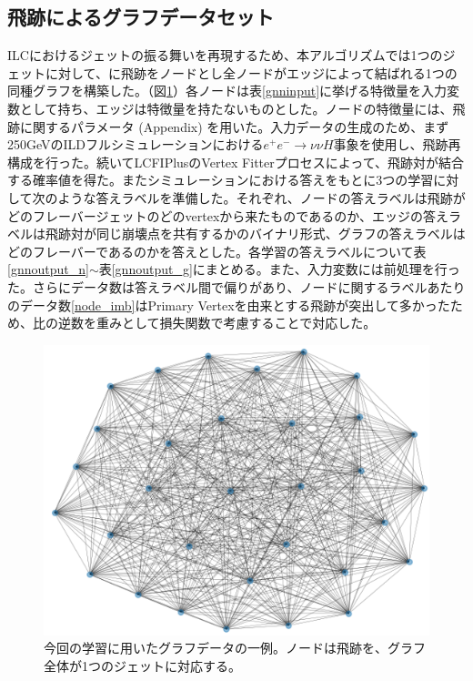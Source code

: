 \subsection{飛跡によるグラフデータセット}
ILCにおけるジェットの振る舞いを再現するため、本アルゴリズムでは1つのジェットに対して、に飛跡をノードとし全ノードがエッジによって結ばれる1つの同種グラフを構築した。（図\ref{1graph}）各ノードは表\ref{gnninput}に挙げる特徴量を入力変数として持ち、エッジは特徴量を持たないものとした。ノードの特徴量には、飛跡に関するパラメータ (Appendix) を用いた。入力データの生成のため、まず250GeVのILDフルシミュレーションにおける$e^+e^- \rightarrow \nu \nu H$事象を使用し、飛跡再構成を行った。続いてLCFIPlusのVertex Fitterプロセスによって、飛跡対が結合する確率値を得た。またシミュレーションにおける答えをもとに3つの学習に対して次のような答えラベルを準備した。それぞれ、ノードの答えラベルは飛跡がどのフレーバージェットのどのvertexから来たものであるのか、エッジの答えラベルは飛跡対が同じ崩壊点を共有するかのバイナリ形式、グラフの答えラベルはどのフレーバーであるのかを答えとした。各学習の答えラベルについて表\ref{gnnoutput_n}$\sim$表\ref{gnnoutput_g}にまとめる。また、入力変数には前処理を行った。さらにデータ数は答えラベル間で偏りがあり、ノードに関するラベルあたりのデータ数\ref{node_imb}はPrimary Vertexを由来とする飛跡が突出して多かったため、比の逆数を重みとして損失関数で考慮することで対応した。
\begin{figure}[H]
	\begin{center}
 \includegraphics[keepaspectratio, scale=0.5]
 	{Figure/Flavortagging/graphexample.png}
 		\caption{今回の学習に用いたグラフデータの一例。ノードは飛跡を、グラフ全体が1つのジェットに対応する。}
 		\label{1graph}
	\end{center}
\end{figure}

